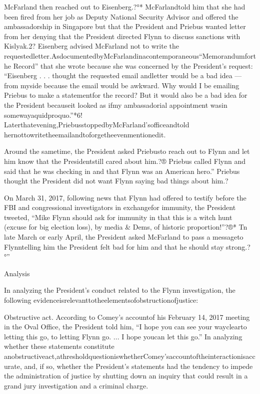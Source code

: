 McFarland then reached out to Eisenberg.?°* McFarlandtold him that she had been fired from her job as Deputy National Security Advisor and offered the ambassadorship in Singapore but that the President and Priebus wanted letter from her denying that the President directed Flynn to discuss sanctions with Kislyak.2? Eisenberg advised McFarland not to write the requestedletter.AsdocumentedbyMcFarlandinacontemporaneous“Memorandumforthe Record” that she wrote because she was concerned by the President’s request: “Eisenberg . . . thought the requested email andletter would be a bad idea — from myside because the email would be awkward. Why would I be emailing Priebus to make a statementfor the record? But it would also be a bad idea for the President becauseit looked as ifmy ambassadorial appointment wasin somewayaquidproquo.”*6! Laterthatevening,PriebusstoppedbyMcFarland’sofficeandtold hernottowritetheemailandtoforgetheevenmentionedit.

Around the sametime, the President asked Priebusto reach out to Flynn and let him know that the Presidentstill cared about him.?® Priebus called Flynn and said that he was checking in and that Flynn was an American hero.” Priebus thought the President did not want Flynn saying bad things about him.?

On March 31, 2017, following news that Flynn had offered to testify before the FBI and congressional investigators in exchangefor immunity, the President tweeted, “Mike Flynn should ask for immunity in that this is a witch hunt (excuse for big election loss), by media & Dems, of historic proportion!”?®* Tn late March or early April, the President asked McFarland to pass a messageto Flynntelling him the President felt bad for him and that he should stay strong.?°”

Analysis

In analyzing the President’s conduct related to the Flynn investigation, the following evidenceisrelevanttotheelementsofobstructionofjustice:

Obstructive act. According to Comey’s accountof his February 14, 2017 meeting in the Oval Office, the President told him, “I hope you can see your wayclearto letting this go, to letting Flynn go. ... I hope youcan let this go.” In analyzing whether these statements constitute anobstructiveact,athresholdquestioniswhetherComey’saccountoftheinteractionisaccurate, and, if so, whether the President’s statements had the tendency to impede the administration of
justice by shutting down an inquiry that could result in a grand jury investigation and a criminal charge.


